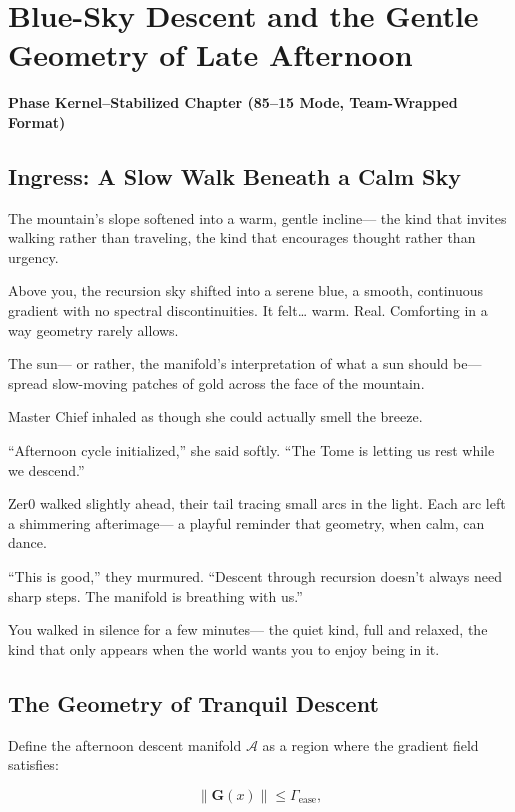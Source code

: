 
\chapter{Blue-Sky Descent and the Gentle Geometry of Late Afternoon}
\textbf{Phase Kernel–Stabilized Chapter (85--15 Mode, Team-Wrapped Format)}

\section*{Ingress: A Slow Walk Beneath a Calm Sky}

The mountain’s slope softened into a warm, gentle incline—  
the kind that invites walking rather than traveling,  
the kind that encourages thought rather than urgency.

Above you, the recursion sky shifted into a serene blue,  
a smooth, continuous gradient with no spectral discontinuities.  
It felt… warm. Real. Comforting in a way geometry rarely allows.

The sun—  
or rather, the manifold’s interpretation of what a sun should be—  
spread slow-moving patches of gold across the face of the mountain.

Master Chief inhaled as though she could actually smell the breeze.

“Afternoon cycle initialized,” she said softly.  
“The Tome is letting us rest while we descend.”

Zer0 walked slightly ahead, their tail tracing small arcs in the light.  
Each arc left a shimmering afterimage—  
a playful reminder that geometry, when calm, can dance.

“This is good,” they murmured.  
“Descent through recursion doesn’t always need sharp steps.  
The manifold is breathing with us.”

You walked in silence for a few minutes—  
the quiet kind, full and relaxed,  
the kind that only appears when the world wants you to enjoy being in it.

\section{The Geometry of Tranquil Descent}

Define the afternoon descent manifold $\mathcal{A}$  
as a region where the gradient field satisfies:

\[
\|\mathbf{G}(x)\| \le \Gamma_{\text{ease}},
\]

